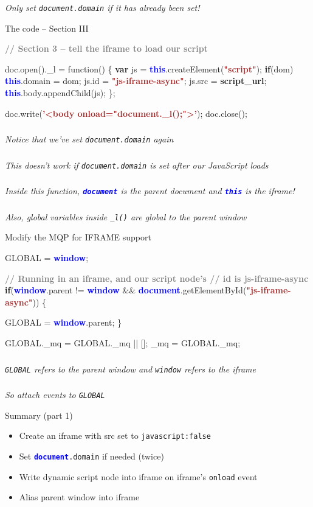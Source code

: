 \documentclass{beamer}
\newcommand{\innersplash}[1]{
  \begin{center}
    \Large \textrm{\textit{ #1 } }
  \end{center}
}
\newcommand{\splashslide}[2][{}]{
  \begin{frame}
  \frametitle{#1}
  \innersplash{#2}
  \end{frame}
}
\def\gray<#1>#2{\textcolor<#1>{gray}{\textbf<#1>{#2}}}
\def\brown<#1>#2{\textcolor<#1>{brown}{\textbf<#1>{#2}}}
\def\green<#1>#2{\textcolor<#1>{dark-green}{\textbf<#1>{#2}}}
\def\blue<#1>#2{\textcolor<#1>{blue}{\textbf<#1>{#2}}}
\begin{document}
\splashslide{Only set \texttt{document.domain} if it has already been set!}

\begin{frame}[fragile]{The code -- Section III}
\begin{semiverbatim}
\gray<1>{// Section 3 -- tell the iframe to load our script}

doc.open().\_l = function() \{
    \green<1>{var} js = \blue<1>{this}.createElement(\brown<1>{"script"});
    \green<1>{if}(dom)
        \blue<1>{this}.domain = dom;
    js.id = \brown<1>{"js-iframe-async"};
    js.src = \textbf{script\_url};
    \blue<1>{this}.body.appendChild(js);
\};

doc.write(\brown<1>{'<body onload="document.\_l();">'});
doc.close();
\end{semiverbatim}
\end{frame}

\splashslide{Notice that we've set \texttt{document.domain} again}

\splashslide{This doesn't work if \texttt{document.domain} is set after our JavaScript loads}

\splashslide{Inside this function, \blue<1>{\texttt{document}} is the parent document and \blue<1>{\texttt{this}} is the iframe!}

\splashslide{Also, global variables inside \texttt{\_l()} are global to the parent window}

\begin{frame}[fragile]{Modify the MQP for IFRAME support}
\begin{semiverbatim}
GLOBAL = \blue<1>{window};

\gray<1>{// Running in an iframe, and our script node's
// id is js-iframe-async}
\green<1>{if}(\blue<1>{window}.parent != \blue<1>{window} &&
   \blue<1>{document}.getElementById(\brown<1>{"js-iframe-async"})) \{

    GLOBAL = \blue<1>{window}.parent;
\}

GLOBAL.\_mq = GLOBAL.\_mq || [];
\_mq = GLOBAL.\_mq;
\end{semiverbatim}
\end{frame}

\splashslide{\texttt{GLOBAL} refers to the parent window and \texttt{window} refers to the iframe}

\splashslide{So attach events to \texttt{GLOBAL}}

\begin{frame}{Summary (part 1)}
\begin{itemize}
  \item Create an iframe with src set to \texttt{javascript:false}
  \item Set \texttt{\blue<1>{document}.domain} if needed (twice)
  \item Write dynamic script node into iframe on iframe's \texttt{onload} event
  \item Alias parent window into iframe
\end{itemize}
\end{frame}
\end{document}
